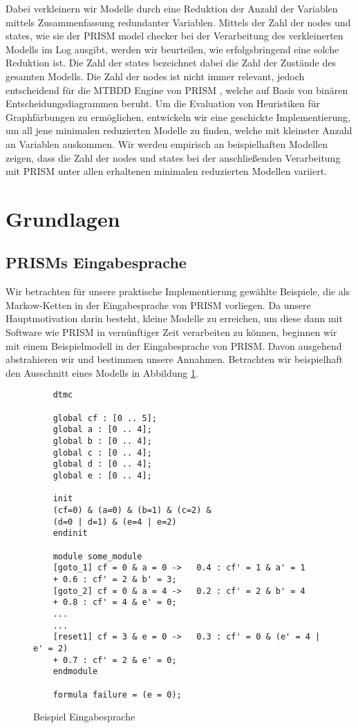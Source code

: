 \documentclass[a4paper]{article}
\newcommand{\mcpl}{Markow-Ketten}
\theoremstyle{nonumberplain}
\begin{document}
Dabei verkleinern wir Modelle durch eine Reduktion der Anzahl der Variablen mittels Zusammenfassung redundanter Variablen. Mittels der Zahl der nodes und states, wie sie der PRISM model checker bei der Verarbeitung des verkleinerten Modells im Log ausgibt, werden wir beurteilen, wie erfolgsbringend eine solche Reduktion ist. Die Zahl der states bezeichnet dabei die Zahl der Zustände des gesamten Modells. Die Zahl der nodes ist nicht immer relevant, jedoch entscheidend für die MTBDD Engine von PRISM \cite{Par02}, welche auf Basis von binären Entscheidungsdiagrammen beruht.
Um die Evaluation von Heuristiken für Graphfärbungen zu ermöglichen, entwickeln wir eine geschickte Implementierung, um all jene minimalen reduzierten Modelle zu finden, welche mit kleinster Anzahl an Variablen auskommen.
Wir werden empirisch an beispielhaften Modellen zeigen, dass die Zahl der nodes und states bei der anschließenden Verarbeitung mit PRISM unter allen erhaltenen minimalen reduzierten Modellen variiert.


\section{Grundlagen}

\subsection{PRISMs Eingabesprache}

Wir betrachten für unsere praktische Implementierung gewählte Beispiele, die als \mcpl{} in der Eingabesprache von PRISM vorliegen. Da unsere Hauptmotivation darin besteht, kleine Modelle zu erreichen, um diese dann mit Software wie PRISM in vernünftiger Zeit verarbeiten zu können, beginnen wir mit einem Beispielmodell in der Eingabesprache von PRISM. Davon ausgehend abstrahieren wir und bestimmen unsere Annahmen. Betrachten wir beispielhaft den Ausschnitt eines Modells in Abbildung \ref{bspeingspr}.

\begin{figure}
\caption{Beispiel Eingabesprache}\label{bspeingspr}
{
	\footnotesize
	\begin{lstlisting}
	dtmc
	
	global cf : [0 .. 5];
	global a : [0 .. 4];
	global b : [0 .. 4];
	global c : [0 .. 4];
	global d : [0 .. 4];
	global e : [0 .. 4];
	
	init
	(cf=0) & (a=0) & (b=1) & (c=2) &
	(d=0 | d=1) & (e=4 | e=2)
	endinit
	
	module some_module
	[goto_1] cf = 0 & a = 0 ->   0.4 : cf' = 1 & a' = 1
	+ 0.6 : cf' = 2 & b' = 3;
	[goto_2] cf = 0 & a = 4 ->   0.2 : cf' = 2 & b' = 4
	+ 0.8 : cf' = 4 & e' = 0;
	...
	...
	[reset1] cf = 3 & e = 0 ->   0.3 : cf' = 0 & (e' = 4 | e' = 2)
	+ 0.7 : cf' = 2 & e' = 0;
	endmodule
	
	formula failure = (e = 0);
	\end{lstlisting}
}
\end{figure}
\end{document}
